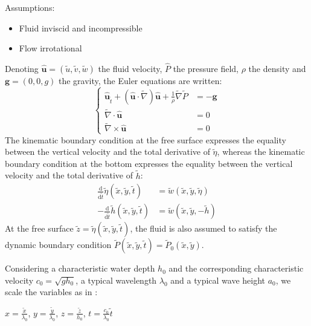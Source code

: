 \documentclass[11pt,a4paper]{article}
\begin{document}
Assumptions:
\begin{itemize}
\item Fluid inviscid and incompressible
\item Flow irrotational
\end{itemize}
Denoting $\mathbf{\hat{u}} = (\tilde{u},\tilde{v}, \tilde{w})$ the fluid velocity, $\hat{P}$ the pressure field, $\rho$ the density and $\mathbf{g} = (0,0,g)$ the gravity, the Euler equations are written: 
\begin{equation}
	\left\lbrace
		\begin{array}{rll}
\displaystyle \mathbf{\hat{u}}_{\tilde{t}} + (\mathbf{\hat{u}} \cdot \tilde{\nabla}) \mathbf{\hat{u}} + \frac{1}{\rho} \tilde{\nabla}\tilde{P} & =  -\mathbf{g} \\
\tilde{\nabla} \cdot \mathbf{\hat{u}} & = 0 \\
\tilde{\nabla} \times \mathbf{\hat{u}} & = 0
		\end{array}
	\right.
\end{equation}
The kinematic boundary condition at the free surface expresses the equality between the vertical velocity and the total derivative of $\tilde{\eta}$, whereas the kinematic boundary condition at the bottom expresses the equality between the vertical velocity and the total derivative of $\tilde{h}$:
\begin{align}
\frac{\mathrm{d}}{\mathrm{d}\tilde{t}} \tilde{\eta}(\tilde{x},\tilde{y},\tilde{t}) & = \tilde{w}(\tilde{x},\tilde{y},\tilde{\eta}) \\
-\frac{\mathrm{d}}{\mathrm{d}\tilde{t}} \tilde{h}(\tilde{x},\tilde{y},\tilde{t}) & = \tilde{w}(\tilde{x},\tilde{y},-\tilde{h})
\end{align}
At the free surface $\tilde{z} = \tilde{\eta}(\tilde{x},\tilde{y},\tilde{t})$, the fluid is also assumed to satisfy the dynamic boundary condition $\tilde{P}
(\tilde{x},\tilde{y},\tilde{t}) = \tilde{P}_0(\tilde{x},\tilde{y})$.

Considering a characteristic water depth $h_0$ and the corresponding characteristic velocity $c_0 = \sqrt{g h_0}$, a typical wavelength $\lambda_0$ and a typical wave height $a_0$, we scale the variables as in \cite{DM2013}: 

\begin{center}
$ x = \displaystyle \frac{\tilde{x}}{\lambda_0}$, $\displaystyle y = \frac{\tilde{y}}{\lambda_0}$, $ \displaystyle z = \frac{\tilde{z}}{h_0}$, $\displaystyle t = \frac{c_0}{\lambda_0}\tilde{t}$
\end{center}
\end{document}
